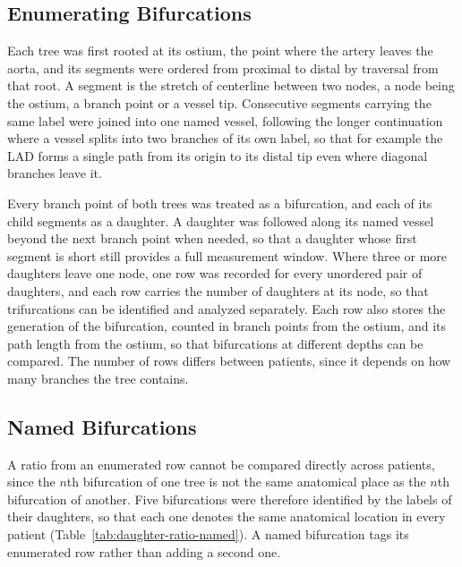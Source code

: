 \subsection{Enumerating Bifurcations}
\label{sec:daughter-ratio-enumerate}

Each tree was first rooted at its ostium, the point where the artery leaves the aorta, and its segments were ordered from proximal to distal by traversal from that root.
A segment is the stretch of centerline between two nodes, a node being the ostium, a branch point or a vessel tip.
Consecutive segments carrying the same label were joined into one named vessel, following the longer continuation where a vessel splits into two branches of its own label, so that for example the LAD forms a single path from its origin to its distal tip even where diagonal branches leave it.

Every branch point of both trees was treated as a bifurcation, and each of its child segments as a daughter.
A daughter was followed along its named vessel beyond the next branch point when needed, so that a daughter whose first segment is short still provides a full measurement window.
Where three or more daughters leave one node, one row was recorded for every unordered pair of daughters, and each row carries the number of daughters at its node, so that trifurcations can be identified and analyzed separately.
Each row also stores the generation of the bifurcation, counted in branch points from the ostium, and its path length from the ostium, so that bifurcations at different depths can be compared.
The number of rows differs between patients, since it depends on how many branches the tree contains.

\subsection{Named Bifurcations}
\label{sec:daughter-ratio-named}

A ratio from an enumerated row cannot be compared directly across patients, since the $n$th bifurcation of one tree is not the same anatomical place as the $n$th bifurcation of another.
Five bifurcations were therefore identified by the labels of their daughters, so that each one denotes the same anatomical location in every patient (Table~\ref{tab:daughter-ratio-named}).
A named bifurcation tags its enumerated row rather than adding a second one.

